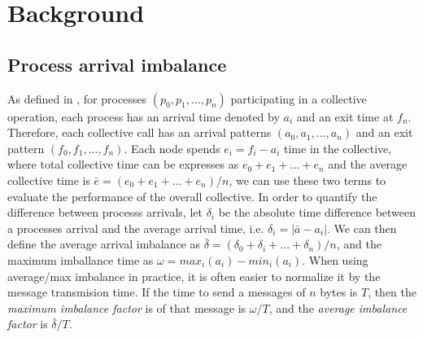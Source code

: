 \section{Background}

\subsection{Process arrival imbalance} %
As defined in \cite{Faraj2008StudyProcArrivalMPIColl}, for processes $(p_0, p_1,...,p_n)$ participating in a collective operation, each process has an arrival time denoted by $a_i$ and an exit time at $f_n$.
Therefore, each collective call has an arrival patterns $(a_0, a_1, ..., a_n)$ and an exit pattern $(f_0, f_1, ..., f_n)$.
Each node spends $e_i = f_i - a_i$ time in the collective, where total collective time can be expresses as $e_0 + e_1 + ... + e_n$ and the average collective time is $\bar{e} = (e_0 + e_1 + ... + e_n)/n$, we can use these two terms to evaluate the performance of the overall collective.
In order to quantify the difference between processs arrivals, let $\delta_i$ be the absolute time difference between a processes arrival and the average arrival time, i.e. $\delta_i = |\bar{a} - a_i|$. 
We can then define the average arrival imbalance as $\bar{\delta}=(\delta_0 + \delta_i + ... + \delta_n)/n$, and the maximum imballance time as $\omega = max_i(a_i)-min_i(a_i)$.
When using average/max imbalance in practice, it is often easier to normalize it by the message transmision time.
If the time to send a messages of $n$ bytes is $T$, then the \textit{maximum imbalance factor} is of that message is $\omega/T$, and the \textit{average imbalance factor} is $\bar{\delta}/T$.

